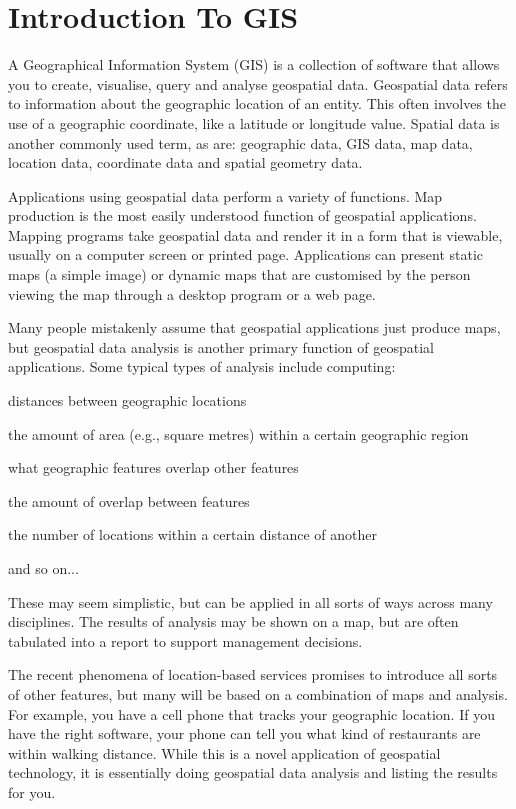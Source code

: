\chapter{Introduction To GIS}

A Geographical Information System (GIS) is a collection of software that
allows you to create, visualise, query and analyse geospatial data. Geospatial
data refers to information about the geographic location of an entity. This
often involves the use of a geographic coordinate, like a latitude or
longitude value. Spatial data is another commonly used term, as are:
geographic data, GIS data, map data, location data, coordinate data and
spatial geometry data.

Applications using geospatial data perform a variety of functions. Map
production is the most easily understood function of geospatial applications.
Mapping programs take geospatial data and render it in a form that is
viewable, usually on a computer screen or printed page. Applications can
present static maps (a simple image) or dynamic maps that are customised by
the person viewing the map through a desktop program or a web page.

Many people mistakenly assume that geospatial applications just produce maps,
but geospatial data analysis is another primary function of geospatial
applications. Some typical types of analysis include computing:

\begin{compactenum}
\item distances between geographic locations
\item the amount of area (e.g., square metres) within a certain geographic region
\item what geographic features overlap other features
\item the amount of overlap between features
\item the number of locations within a certain distance of another
\item and so on...
\end{compactenum}

These may seem simplistic, but can be applied in all sorts of ways across many
disciplines. The results of analysis may be shown on a map, but are often
tabulated into a report to support management decisions.

The recent phenomena of location-based services promises to introduce all
sorts of other features, but many will be based on a combination of maps and
analysis. For example, you have a cell phone that tracks your geographic
location. If you have the right software, your phone can tell you what kind of
restaurants are within walking distance. While this is a novel application of
geospatial technology, it is essentially doing geospatial data analysis and
listing the results for you.

